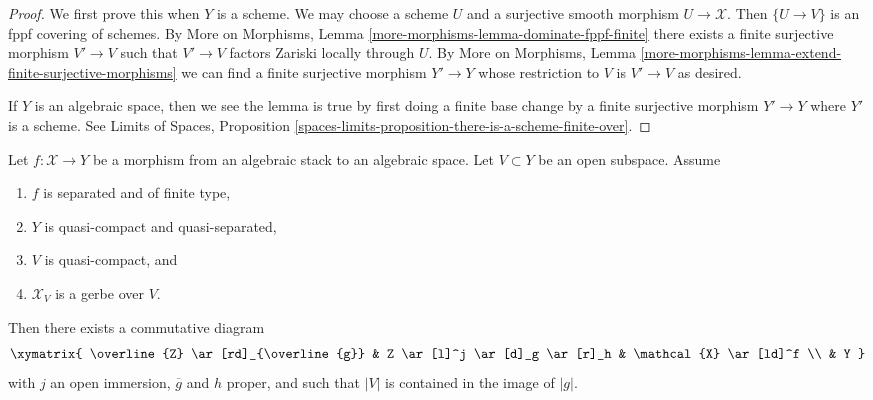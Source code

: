 \begin{proof}
We first prove this when $Y$ is a scheme.
We may choose a scheme $U$ and a surjective smooth morphism
$U \to \mathcal{X}$. Then $\{U \to V\}$ is an fppf covering of schemes.
By More on Morphisms, Lemma \ref{more-morphisms-lemma-dominate-fppf-finite}
there exists a finite surjective morphism
$V' \to V$ such that $V' \to V$ factors Zariski locally
through $U$. By
More on Morphisms, Lemma
\ref{more-morphisms-lemma-extend-finite-surjective-morphisms}
we can find a finite surjective morphism $Y' \to Y$
whose restriction to $V$ is $V' \to V$ as desired.

\medskip\noindent
If $Y$ is an algebraic space, then we see the lemma is true by
first doing a finite base change by a finite surjective morphism
$Y' \to Y$ where $Y'$ is a scheme. See
Limits of Spaces, Proposition
\ref{spaces-limits-proposition-there-is-a-scheme-finite-over}.
\end{proof}

\begin{lemma}
\label{lemma-make-section}
Let $f : \mathcal{X} \to Y$ be a morphism from an algebraic stack
to an algebraic space. Let $V \subset Y$ be an open subspace.
Assume
\begin{enumerate}
\item $f$ is separated and of finite type,
\item $Y$ is quasi-compact and quasi-separated,
\item $V$ is quasi-compact, and
\item $\mathcal{X}_V$ is a gerbe over $V$.
\end{enumerate}
Then there exists a commutative diagram
$$
\xymatrix{
\overline{Z} \ar[rd]_{\overline{g}} &
Z \ar[l]^j \ar[d]_g \ar[r]_h & \mathcal{X} \ar[ld]^f \\
& Y
}
$$
with $j$ an open immersion, $\overline{g}$ and $h$ proper,
and such that $|V|$ is contained in the image of $|g|$.
\end{lemma}

